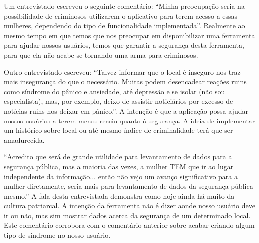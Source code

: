 Um entrevistado escreveu o seguinte comentário: “Minha preocupação seria na possibilidade de criminosos utilizarem o aplicativo para terem acesso a essas mulheres, dependendo do tipo de funcionalidade implementada”. Realmente ao mesmo tempo em que temos que nos preocupar em disponibilizar uma ferramenta para ajudar nossos usuários, temos que garantir a segurança desta ferramenta, para que ela não acabe se tornando uma arma para criminosos.

Outro entrevistado escreveu: “Talvez informar que o local é inseguro nos traz mais insegurança do que o necessário. Muitas podem desencadear reações ruins como síndrome do pânico e ansiedade, até depressão e se isolar (não sou especialista), mas, por exemplo, deixo de assistir noticiários por excesso de notícias ruins nos deixar em pânico.”. A intenção é que a aplicação possa ajudar nossos usuários a terem menos receio quanto à segurança. A ideia de implementar um histórico sobre local ou até mesmo índice de criminalidade terá que ser amadurecida.

“Acredito que será de grande utilidade para levantamento de dados para a segurança pública, mas a maioria das vezes, a mulher TEM que ir ao lugar independente da informação... então não vejo um avanço significativo para a mulher diretamente, seria mais para levantamento de dados da segurança pública mesmo.” A fala desta entrevistada demonstra como hoje ainda há muito da cultura patriarcal. A intenção da ferramenta não é dizer aonde nosso usuário deve ir ou não, mas sim mostrar dados acerca da segurança de um determinado local. Este comentário corrobora com o comentário anterior sobre acabar criando algum tipo de síndrome no nosso usuário.

